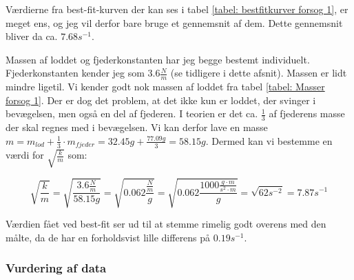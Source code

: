 Værdierne fra best-fit-kurven der kan ses i tabel \ref{tabel: bestfitkurver forsog 1}, er meget ens, og jeg vil derfor bare bruge et gennemsnit af dem. 
Dette gennemsnit bliver da ca. $7.68s^{-1}$.

Massen af loddet og fjederkonstanten har jeg begge bestemt individuelt. 
Fjederkonstanten kender jeg som $3.6\frac{N}{m}$ (se tidligere i dette afsnit). 
Massen er lidt mindre ligetil. 
Vi kender godt nok massen af loddet fra tabel \ref{tabel: Masser forsog 1}. 
Der er dog det problem, at det ikke kun er loddet, der svinger i bevægelsen, men også en del af fjederen. 
I teorien er det ca. $\frac{1}{3}$ af fjederens masse der skal regnes med i bevægelsen.
Vi kan derfor lave en masse $m=m_{lod}+\frac{1}{3}\cdot m_{fjeder}=32.45g+\frac{77.09g}{3}=58.15g$. 
Dermed kan vi bestemme en værdi for $\sqrt{\frac{k}{m}}$ som:

$$\sqrt{\frac{k}{m}}=\sqrt{\frac{3.6\frac{N}{m}}{58.15g}}=\sqrt{0.062\frac{\frac{N}{m}}{g}}=\sqrt{0.062\frac{1000\frac{g\cdot m}{s^2\cdot m}}{g}}=\sqrt{62s^{-2}}=7.87s^{-1}$$

Værdien fået ved best-fit ser ud til at stemme rimelig godt overens med den målte, da de har en forholdsvist lille differens på $0.19s^{-1}$. 



\subsubsection{Vurdering af data}\label{exp1: Vurdering af data}


